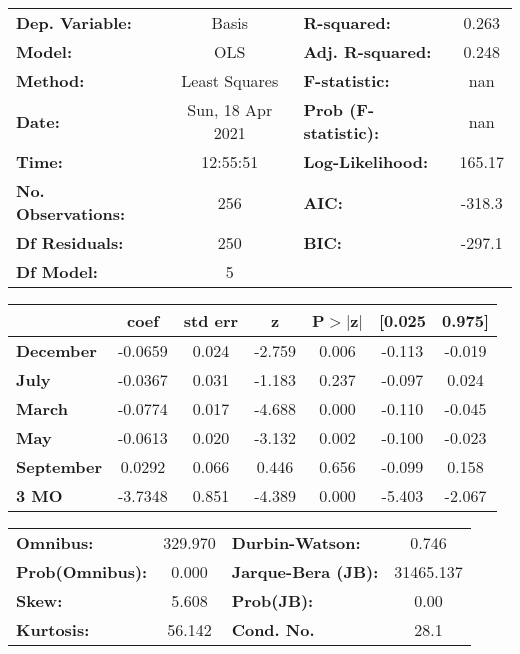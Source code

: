 \begin{center}
\begin{tabular}{lclc}
\toprule
\textbf{Dep. Variable:}    &      Basis       & \textbf{  R-squared:         } &     0.263   \\
\textbf{Model:}            &       OLS        & \textbf{  Adj. R-squared:    } &     0.248   \\
\textbf{Method:}           &  Least Squares   & \textbf{  F-statistic:       } &       nan   \\
\textbf{Date:}             & Sun, 18 Apr 2021 & \textbf{  Prob (F-statistic):} &      nan    \\
\textbf{Time:}             &     12:55:51     & \textbf{  Log-Likelihood:    } &    165.17   \\
\textbf{No. Observations:} &         256      & \textbf{  AIC:               } &    -318.3   \\
\textbf{Df Residuals:}     &         250      & \textbf{  BIC:               } &    -297.1   \\
\textbf{Df Model:}         &           5      & \textbf{                     } &             \\
\bottomrule
\end{tabular}
\begin{tabular}{lcccccc}
                   & \textbf{coef} & \textbf{std err} & \textbf{z} & \textbf{P$> |$z$|$} & \textbf{[0.025} & \textbf{0.975]}  \\
\midrule
\textbf{December}  &      -0.0659  &        0.024     &    -2.759  &         0.006        &       -0.113    &       -0.019     \\
\textbf{July}      &      -0.0367  &        0.031     &    -1.183  &         0.237        &       -0.097    &        0.024     \\
\textbf{March}     &      -0.0774  &        0.017     &    -4.688  &         0.000        &       -0.110    &       -0.045     \\
\textbf{May}       &      -0.0613  &        0.020     &    -3.132  &         0.002        &       -0.100    &       -0.023     \\
\textbf{September} &       0.0292  &        0.066     &     0.446  &         0.656        &       -0.099    &        0.158     \\
\textbf{3 MO}      &      -3.7348  &        0.851     &    -4.389  &         0.000        &       -5.403    &       -2.067     \\
\bottomrule
\end{tabular}
\begin{tabular}{lclc}
\textbf{Omnibus:}       & 329.970 & \textbf{  Durbin-Watson:     } &     0.746  \\
\textbf{Prob(Omnibus):} &   0.000 & \textbf{  Jarque-Bera (JB):  } & 31465.137  \\
\textbf{Skew:}          &   5.608 & \textbf{  Prob(JB):          } &      0.00  \\
\textbf{Kurtosis:}      &  56.142 & \textbf{  Cond. No.          } &      28.1  \\
\bottomrule
\end{tabular}
\end{center}

